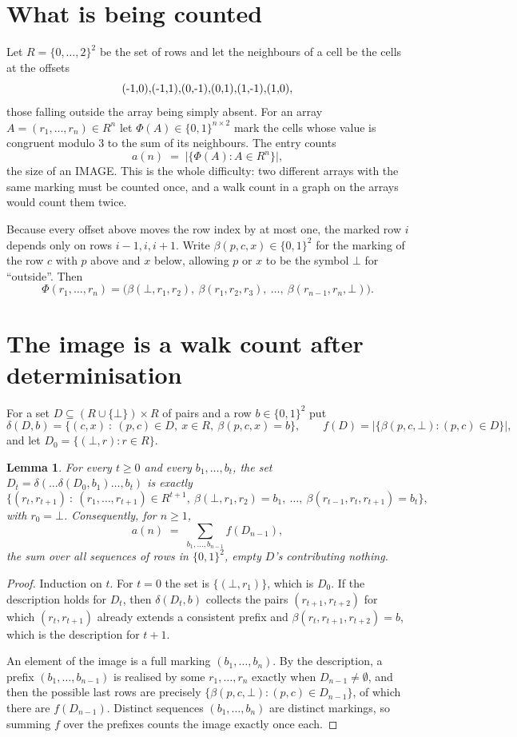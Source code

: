 \documentclass[11pt,a4paper]{article}
\theoremstyle{plain}
\newtheorem{lemma}[theorem]{Lemma}
\theoremstyle{definition}
\begin{document}
\section{What is being counted}

Let $R=\{0,\dots,2\}^{2}$ be the set of rows and let the neighbours of a cell be the
cells at the offsets
\[
$(-1,0)$, $(-1,1)$, $(0,-1)$, $(0,1)$, $(1,-1)$, $(1,0)$,
\]
those falling outside the array being simply absent. For an array
$A=(r_1,\dots,r_n)\in R^n$ let $\Phi(A)\in\{0,1\}^{n\times2}$ mark the cells whose value
is congruent modulo 3 to the sum of its neighbours. The entry counts
\[
a(n)\;=\;\bigl|\{\Phi(A):A\in R^n\}\bigr| ,
\]
the size of an IMAGE. This is the whole difficulty: two different arrays with the same marking
must be counted once, and a walk count in a graph on the arrays would count them twice.

Because every offset above moves the row index by at most one, the marked row $i$ depends only
on rows $i-1,i,i+1$. Write $\beta(p,c,x)\in\{0,1\}^{2}$ for the marking of the row $c$
with $p$ above and $x$ below, allowing $p$ or $x$ to be the symbol $\bot$ for ``outside''.
Then
\[
\Phi(r_1,\dots,r_n)=\bigl(\beta(\bot,r_1,r_2),\ \beta(r_1,r_2,r_3),\ \dots,\
\beta(r_{n-1},r_n,\bot)\bigr).
\]

\section{The image is a walk count after determinisation}

For a set $D\subseteq(R\cup\{\bot\})\times R$ of pairs and a row $b\in\{0,1\}^{2}$ put
\[
\delta(D,b)=\{(c,x)\ :\ (p,c)\in D,\ x\in R,\ \beta(p,c,x)=b\},\qquad
f(D)=\bigl|\{\beta(p,c,\bot):(p,c)\in D\}\bigr| ,
\]
and let $D_0=\{(\bot,r):r\in R\}$.

\begin{lemma}\label{lem:det}
For every $t\ge0$ and every $b_1,\dots,b_t$, the set
$D_t=\delta(\dots\delta(D_0,b_1)\dots,b_t)$ is exactly
\[
\{(r_t,r_{t+1})\ :\ (r_1,\dots,r_{t+1})\in R^{t+1},\ \beta(\bot,r_1,r_2)=b_1,\ \dots,\
\beta(r_{t-1},r_t,r_{t+1})=b_t\} ,
\]
with $r_0=\bot$. Consequently, for $n\ge1$,
\[
a(n)\;=\;\sum_{b_1,\dots,b_{n-1}}f(D_{n-1}),
\]
the sum over all sequences of rows in $\{0,1\}^{2}$, empty $D$'s contributing nothing.
\end{lemma}

\begin{proof}
Induction on $t$. For $t=0$ the set is $\{(\bot,r_1)\}$, which is $D_0$. If the description
holds for $D_t$, then $\delta(D_t,b)$ collects the pairs $(r_{t+1},r_{t+2})$ for which
$(r_t,r_{t+1})$ already extends a consistent prefix and
$\beta(r_t,r_{t+1},r_{t+2})=b$, which is the description for $t+1$.

An element of the image is a full marking $(b_1,\dots,b_n)$. By the description, a prefix
$(b_1,\dots,b_{n-1})$ is realised by some $r_1,\dots,r_n$ exactly when $D_{n-1}\neq
\emptyset$, and then the possible last rows are precisely
$\{\beta(p,c,\bot):(p,c)\in D_{n-1}\}$, of which there are $f(D_{n-1})$. Distinct
sequences $(b_1,\dots,b_n)$ are distinct markings, so summing $f$ over the prefixes counts the
image exactly once each.
\end{proof}
\end{document}
